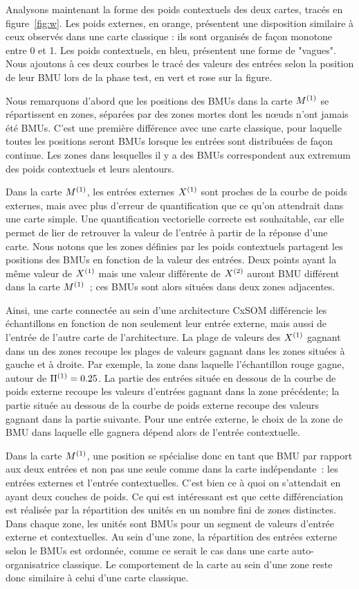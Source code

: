 \documentclass[../main]{subfiles}
\begin{document}
Analysons maintenant la forme des poids contextuels des deux cartes, tracés en figure~\ref{fig:w}.
Les poids externes, en orange, présentent une disposition similaire à ceux observés dans une carte classique : ils sont organisés de façon monotone entre 0 et 1.
Les poids contextuels, en bleu, présentent une forme de "vagues". 
Nous ajoutons à ces deux courbes le tracé des valeurs des entrées selon la position de leur BMU lors de la phase test, en vert et rose sur la figure.

Nous remarquons d'abord que les positions des BMUs dans la carte $M^{({1})}$ se répartissent en zones, séparées par des zones mortes dont les n\oe{}uds n'ont jamais été BMUs.
C'est une première différence avec une carte classique, pour laquelle toutes les positions seront BMUs lorsque les entrées sont distribuées de façon continue.
Les zones dans lesquelles il y a des BMUs correspondent aux extremum des poids contextuels et leurs alentours.

Dans la carte $M^{({1})}$, les entrées externes $X^{({1})}$ sont proches de la courbe de poids externes, mais avec plus d'erreur de quantification que ce qu'on attendrait dans une carte simple. Une quantification vectorielle correcte est souhaitable, car elle permet de lier de retrouver la valeur de l'entrée à partir de la réponse d'une carte.
Nous notons que les zones définies par les poids contextuels partagent les positions des BMUs en fonction de la valeur des entrées. 
Deux points ayant la même valeur de $X^{({1})}$ mais une valeur différente de $X^{({2})}$ auront BMU différent dans la carte $M^{({1})}$~; ces BMUs sont alors situées dans deux zones adjacentes.

Ainsi, une carte connectée au sein d'une architecture CxSOM différencie les échantillons en fonction de non seulement leur entrée externe, mais aussi de l'entrée de l'autre carte de l'architecture. La plage de valeurs des $X^{({1})}$ gagnant dans un des zones recoupe les plages de valeurs gagnant dans les zones situées à gauche et à droite. Par exemple, la zone dans laquelle l'échantillon rouge gagne, autour de $\Pi^{({1})} = 0.25$. La partie des entrées située en dessous de la courbe de poids externe recoupe les valeurs d'entrées gagnant dans la zone précédente; la partie située au dessous de la courbe de poids externe recoupe des valeurs gagnant dans la partie suivante. Pour une entrée externe, le choix de la zone de BMU dans laquelle elle gagnera dépend alors de l'entrée contextuelle. 


Dans la carte $M^{({1})}$, une position se spécialise donc en tant que BMU par rapport aux deux entrées et non pas une seule comme dans la carte indépendante~: les entrées externes et l'entrée contextuelles. C'est bien ce à quoi on s'attendait en ayant deux couches de poids. Ce qui est intéressant est que cette différenciation est réalisée par la répartition des unités en un nombre fini de zones distinctes. Dans chaque zone, les unités sont BMUs pour un segment de valeurs d'entrée externe et contextuelles. Au sein d'une zone, la répartition des entrées externe selon le BMUs est ordonnée, comme ce serait le cas dans une carte auto-organisatrice classique. Le comportement de la carte au sein d'une zone reste donc similaire à celui d'une carte classique.
\end{document}

